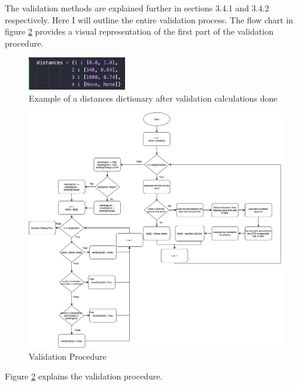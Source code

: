 \documentclass[10pt,a4paper]{report}
\begin{document}
The validation methods are explained further in sections 3.4.1 and 3.4.2 respectively. Here I will outline the entire validation process. The flow chart in figure \ref{fig:valProc} provides a visual representation of the first part of the validation procedure.

\begin{figure}
	\begin{center}
		\includegraphics[width=0.38\textwidth]{DistancesDict}
	\end{center}
	\caption{Example of a distances dictionary after validation calculations done}
	\label{fig:distances}
\end{figure}

\begin{figure}
	\centering
	\includegraphics[scale=0.3]{ValidationProc}
	\caption{Validation Procedure}
	\label{fig:valProc}
\end{figure}

Figure \ref{fig:valProc} explains the validation procedure.
\end{document}
